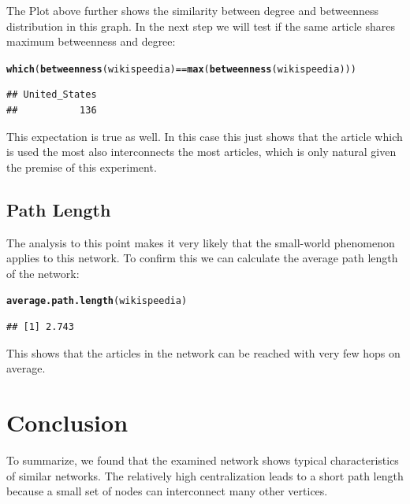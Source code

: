 \documentclass{article}\usepackage[]{graphicx}\usepackage[]{color}
\makeatletter
\newcommand{\hlopt}[1]{\textcolor[rgb]{0,0,0}{#1}}%
\newcommand{\hlstd}[1]{\textcolor[rgb]{0.345,0.345,0.345}{#1}}%
\newcommand{\hlkwd}[1]{\textcolor[rgb]{0.737,0.353,0.396}{\textbf{#1}}}%
\newenvironment{kframe}{%
 \def\at@end@of@kframe{}%
 \ifinner\ifhmode%
  \def\at@end@of@kframe{\end{minipage}}%
  \begin{minipage}{\columnwidth}%
 \fi\fi%
 \def\FrameCommand##1{\hskip\@totalleftmargin \hskip-\fboxsep
 \colorbox{shadecolor}{##1}\hskip-\fboxsep
     \hskip-\linewidth \hskip-\@totalleftmargin \hskip\columnwidth}%
 \MakeFramed {\advance\hsize-\width
   \@totalleftmargin\z@ \linewidth\hsize
   \@setminipage}}%
 {\par\unskip\endMakeFramed%
 \at@end@of@kframe}
\newenvironment{knitrout}{}{} %
\makeatother
\begin{document}
The Plot above further shows the similarity between degree and betweenness distribution in this graph. In the next step we will test if the same article shares maximum betweenness and degree:
\begin{knitrout}
\color{fgcolor}\begin{kframe}
\begin{alltt}
\hlkwd{which}\hlstd{(}\hlkwd{betweenness}\hlstd{(wikispeedia)} \hlopt{==} \hlkwd{max}\hlstd{(}\hlkwd{betweenness}\hlstd{(wikispeedia)))}
\end{alltt}
\begin{verbatim}
## United_States 
##           136
\end{verbatim}
\end{kframe}
\end{knitrout}


This expectation is true as well. In this case this just shows that the article which is used the most also interconnects the most articles, which is only natural given the premise of this experiment.

\subsection{Path Length}
The analysis to this point makes it very likely that the small-world phenomenon applies to this network. To confirm this we can calculate the average path length of the network:
\begin{knitrout}
\color{fgcolor}\begin{kframe}
\begin{alltt}
\hlkwd{average.path.length}\hlstd{(wikispeedia)}
\end{alltt}
\begin{verbatim}
## [1] 2.743
\end{verbatim}
\end{kframe}
\end{knitrout}

This shows that the articles in the network can be reached with very few hops on average.

\section{Conclusion}
To summarize, we found that the examined network shows typical characteristics of similar networks. The relatively high centralization leads to a short path length because a small set of nodes can interconnect many other vertices.
\end{document}
